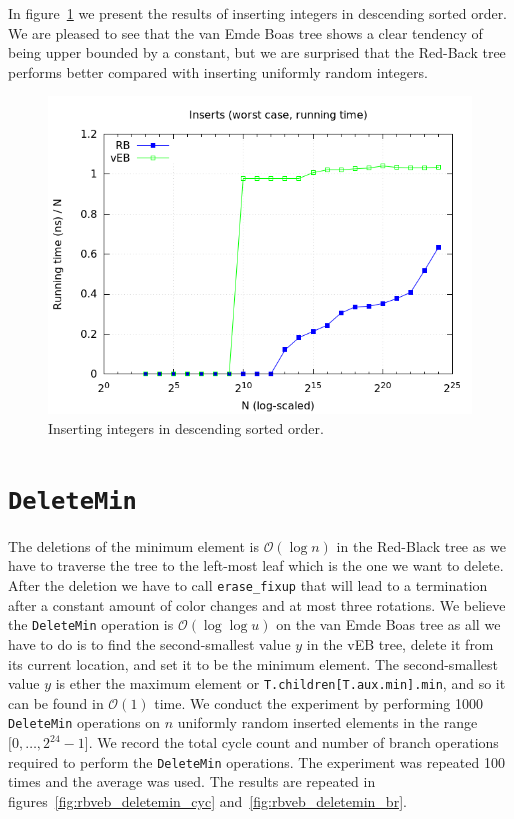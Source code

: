 \documentclass[a4paper,oneside,article,11pt]{memoir}
\begin{document}
In figure~\ref{fig:rbveb_insert_rt_div_n_worst_2} we present the results of inserting integers in descending sorted order. We are pleased to see that the van Emde Boas tree shows a clear tendency of being upper bounded by a constant, but we are surprised that the Red-Back tree performs better compared with inserting uniformly random integers.

\begin{figure}[H]
\includegraphics[scale=0.5]{../res/rbveb/rbveb_insert_rt_div_n_worst_2.png}
\caption{Inserting integers in descending sorted order.}
\label{fig:rbveb_insert_rt_div_n_worst_2}
\end{figure}

\section{\texttt{DeleteMin}}

The deletions of the minimum element is $\mathcal{O}(\log n)$ in the Red-Black tree as we have to traverse the tree to the left-most leaf which is the one we want to delete. After the deletion we have to call \texttt{erase\_fixup} that will lead to a termination after a constant amount of color changes and at most three rotations. We believe the \texttt{DeleteMin} operation is $\mathcal{O}(\log \log u)$ on the van Emde Boas tree as all we have to do is to find the second-smallest value $y$ in the vEB tree, delete it from its current location, and set it to be the minimum element. The second-smallest value $y$ is ether the maximum element or \texttt{T.children[T.aux.min].min}, and so it can be found in $\mathcal{O}(1)$ time. We conduct the experiment by performing 1000  \texttt{DeleteMin} operations on $n$ uniformly random inserted elements in the range $[0, \dots, 2^{24}-1$]. We record the total cycle count and number of branch operations required to perform the \texttt{DeleteMin} operations. The experiment was repeated 100 times and the average was used. The results are repeated in figures~\ref{fig:rbveb_deletemin_cyc} and~\ref{fig:rbveb_deletemin_br}.
\end{document}
